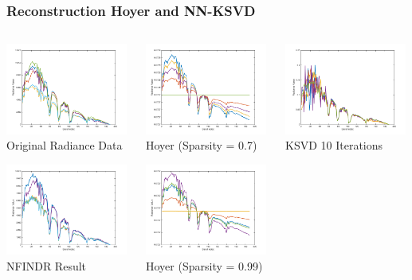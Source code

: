\documentclass{beamer}
\begin{document}
\begin{frame}
\frametitle{Reconstruction Hoyer and NN-KSVD}
\begin{columns}
    \begin{column}{0.33\textwidth}
        \includegraphics[width=4cm,center]{radiance}
        \\ Original Radiance Data
        \centering

        \includegraphics[width=4cm,center]{recon_nfindr}
        \\ NFINDR Result
        \centering
    \end{column}
    \begin{column}{0.33\textwidth}
        \includegraphics[width=4cm,center]{recon_hoyer_0_7}
        \\ Hoyer (Sparsity = 0.7)
        \centering

        \includegraphics[width=4cm,center]{recon_hoyer_0_99}
        \\ Hoyer (Sparsity = 0.99)
        \centering
    \end{column}
    \begin{column}{0.33\textwidth}
        \includegraphics[width=4cm,center]{recon_ksvd_10iter}
        \\ KSVD 10 Iterations
        \centering


\end{column}
\end{columns}
\end{frame}
\end{document}
